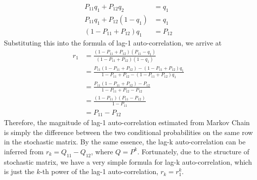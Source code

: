 \begin{align*}
P_{11}q_1 + P_{12}q_2 &= q_1 \\
P_{11}q_1 + P_{12}(1-q_1) &= q_1 \\
(1 - P_{11} + P_{12}) q_1 &= P_{12}
\end{align*}
Substituting this into the formula of lag-1 auto-correlation, we arrive at
\begin{align*}
r_1 &= \frac{(1 - P_{11} + P_{12})(P_{11}-q_1)}{(1 - P_{11} + P_{12})(1-q_1)} \\
&= \frac{P_{11}(1 - P_{11} + P_{12}) - (1 - P_{11} + P_{12})q_1}{1 - P_{11} + P_{12} - (1 - P_{11} + P_{12})q_1} \\
&= \frac{P_{11}(1 - P_{11} + P_{12}) - P_{12}}{1 - P_{11} + P_{12} - P_{12}} \\
&= \frac{(1-P_{11})(P_{11}-P_{12})}{1 - P_{11}} \\
&= P_{11} - P_{12}
\end{align*}
Therefore, the magnitude of lag-1 auto-correlation estimated from Markov Chain is simply the difference between the two conditional probabilities on the same row in the stochastic matrix. By the same essence, the lag-k auto-correlation can be inferred from $r_k = Q_{11} - Q_{12}$, where $Q = P^k$. Fortunately, due to the structure of stochastic matrix, we have a very simple formula for lag-k auto-correlation, which is just the $k$-th power of the lag-1 auto-correlation, $r_k = r_1^k$.

